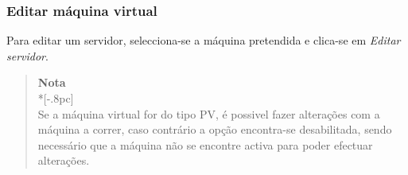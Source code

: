 \subsubsection{Editar máquina virtual}
\label{sec:edit_server}
Para editar um servidor, selecciona-se a máquina pretendida e clica-se em \emph{Editar servidor}.

    \begin{quote}
        {\large \bf Nota} \\*[-.8pc]
        \underline{\hspace{6in}} \\
        Se a máquina virtual for do tipo PV, é possivel fazer alterações com a máquina a correr, caso contrário a opção encontra-se desabilitada, sendo necessário que a máquina não se encontre activa para poder efectuar alterações.
    \end{quote}

